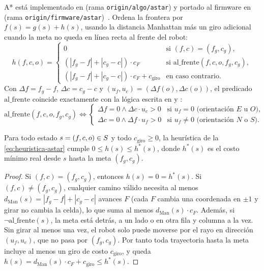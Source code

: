 A* está implementado en  (rama \texttt{origin/algo/astar}) y portado al firmware en  (rama \texttt{origin/firmware/astar})~\cite{hart1968astar}. Ordena la frontera por $f(s) = g(s) + h(s)$, usando la distancia Manhattan más un giro adicional cuando la meta no queda en línea recta al frente del robot:
\begin{equation}
  h(f, c, o) =
  \begin{cases}
    0 & \text{si } (f, c) = (f_g, c_g), \\
    (|f_g - f| + |c_g - c|) \cdot c_F & \text{si } \mathrm{al\_frente}(f, c, o, f_g, c_g), \\
    (|f_g - f| + |c_g - c|) \cdot c_F + c_{\text{giro}} & \text{en caso contrario}.
  \end{cases}
  \label{eq:heuristica-astar}
\end{equation}
Con $\Delta f = f_g - f$, $\Delta c = c_g - c$ y $(u_f, u_c) = (\Delta f(o), \Delta c(o))$, el predicado $\mathrm{al\_frente}$ coincide exactamente con la lógica escrita en  y :
\begin{equation}
  \mathrm{al\_frente}(f, c, o, f_g, c_g) \iff
  \begin{cases}
    \Delta f = 0 \land \Delta c \cdot u_c > 0 & \text{si } u_f = 0 \text{ (orientación } E \text{ u } O\text{)}, \\
    \Delta c = 0 \land \Delta f \cdot u_f > 0 & \text{si } u_f \ne 0 \text{ (orientación } N \text{ o } S\text{)}.
  \end{cases}
  \label{eq:al-frente}
\end{equation}

\begin{proposicion}[Admisibilidad de $h$]
\label{prop:admisibilidad}
Para todo estado $s = (f,c,o) \in S$ y todo $c_{\text{giro}} \ge 0$, la heurística de la \cref{eq:heuristica-astar} cumple $0 \le h(s) \le h^*(s)$, donde $h^*(s)$ es el costo mínimo real desde $s$ hasta la meta $(f_g, c_g)$.
\end{proposicion}

\begin{proof}
Si $(f, c) = (f_g, c_g)$, entonces $h(s) = 0 = h^*(s)$. Si $(f, c) \ne (f_g, c_g)$, cualquier camino válido necesita al menos $d_{\text{Man}}(s) = |f_g - f| + |c_g - c|$ avances $F$ (cada $F$ cambia una coordenada en $\pm 1$ y girar no cambia la celda), lo que suma al menos $d_{\text{Man}}(s) \cdot c_F$. Además, si $\neg\mathrm{al\_frente}(s)$, la meta está detrás, a un lado o en otra fila y columna a la vez. Sin girar al menos una vez, el robot solo puede moverse por el rayo en dirección $(u_f, u_c)$, que no pasa por $(f_g, c_g)$. Por tanto toda trayectoria hasta la meta incluye al menos un giro de costo $c_{\text{giro}}$, y queda $h(s) = d_{\text{Man}}(s) \cdot c_F + c_{\text{giro}} \le h^*(s)$.
\end{proof}

